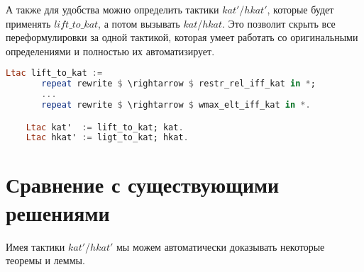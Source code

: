\documentclass[times
              ]{itmo-student-thesis}
\begin{document}
    А также для удобства можно определить тактики $ kat' $/$ hkat' $, которые будет применять $ lift\_to\_kat $, а потом вызывать $ kat $/$ hkat $.
    Это позволит скрыть все переформулировки за одной тактикой, которая умеет работать со оригинальными определениями и полностью их автоматизирует.

    \begin{lstlisting}[mathescape=true, language=haskell]
    Ltac lift_to_kat :=
       repeat rewrite $ \rightarrow $ restr_rel_iff_kat in *;
       ...
       repeat rewrite $ \rightarrow $ wmax_elt_iff_kat in *.

    Ltac kat'  := lift_to_kat; kat.
    Ltac hkat' := ligt_to_kat; hkat.
    \end{lstlisting}





  \section{Сравнение с существующими решениями}

    Имея тактики $ kat' $/$ hkat' $ мы можем автоматически доказывать некоторые теоремы и леммы.
\end{document}
